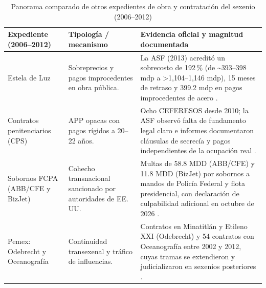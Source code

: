 \begin{table}[H]
\centering
\caption{Panorama comparado de otros expedientes de obra y contratación del sexenio (2006--2012)}
\label{tab:expedientes}
\small
\begin{tabular}{@{}p{2.5cm}p{4cm}p{6.5cm}@{}}
\toprule
\textbf{Expediente (2006--2012)} & \textbf{Tipología / mecanismo} & \textbf{Evidencia oficial y magnitud documentada} \\
\midrule
Estela de Luz & Sobreprecios y pagos improcedentes en obra pública. & La ASF (2013) acreditó un sobrecosto de 192\,\% (de \textasciitilde393--398 mdp a >1,104--1,146 mdp), 15 meses de retraso y 399.2 mdp en pagos improcedentes de acero \citep{asf2013,obrasexpansion2013}. \\
\addlinespace
Contratos penitenciarios (CPS) & APP opacas con pagos rígidos a 20--22 años. & Ocho CEFERESOS desde 2010; la ASF observó falta de fundamento legal claro e informes documentaron cláusulas de secrecía y pagos independientes de la ocupación real \citep{documenta2022,badillo2021}. \\
\addlinespace
Sobornos FCPA (ABB/CFE y BizJet) & Cohecho transnacional sancionado por autoridades de EE.\,UU. & Multas de 58.8 MDD (ABB/CFE) y 11.8 MDD (BizJet) por sobornos a mandos de Policía Federal y flota presidencial, con declaración de culpabilidad adicional en octubre de 2026 \citep{doj2013bizjet,doj2026bizjet,rodriguez2011}. \\
\addlinespace
Pemex: Odebrecht y Oceanografía & Continuidad transexenal y tráfico de influencias. & Contratos en Minatitlán y Etileno XXI (Odebrecht) y 54 contratos con Oceanografía entre 2002 y 2012, cuyas tramas se extendieron y judicializaron en sexenios posteriores \citep{fundar2022,guerrero2018}. \\
\bottomrule
\end{tabular}
\end{table}